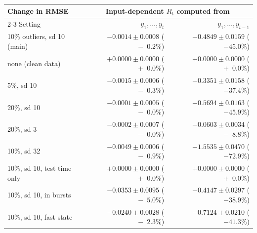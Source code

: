 \small
\begin{tabular}{@{}lrr@{}}
\toprule
Change in RMSE & \multicolumn{2}{c}{Input-dependent $R_t$ computed from} \\
\cmidrule(l){2-3}
Setting & $y_1, \dots, y_t$ & $y_1, \dots, y_{t-1}$ \\
\midrule
10\% outliers, sd 10 (main) & $-0.0014 \pm 0.0008$ ($-\phantom{0}0.2\%$) & $-0.4849 \pm 0.0159$ ($-45.0\%$) \\
none (clean data) & $+0.0000 \pm 0.0000$ ($+\phantom{0}0.0\%$) & $+0.0000 \pm 0.0000$ ($+\phantom{0}0.0\%$) \\
5\%, sd 10 & $-0.0015 \pm 0.0006$ ($-\phantom{0}0.3\%$) & $-0.3351 \pm 0.0158$ ($-37.4\%$) \\
20\%, sd 10 & $-0.0001 \pm 0.0005$ ($-\phantom{0}0.0\%$) & $-0.5694 \pm 0.0163$ ($-45.9\%$) \\
20\%, sd 3 & $-0.0002 \pm 0.0007$ ($-\phantom{0}0.0\%$) & $-0.0603 \pm 0.0034$ ($-\phantom{0}8.8\%$) \\
10\%, sd 32 & $-0.0049 \pm 0.0006$ ($-\phantom{0}0.9\%$) & $-1.5535 \pm 0.0470$ ($-72.9\%$) \\
10\%, sd 10, test time only & $+0.0000 \pm 0.0000$ ($+\phantom{0}0.0\%$) & $+0.0000 \pm 0.0000$ ($+\phantom{0}0.0\%$) \\
10\%, sd 10, in bursts & $-0.0353 \pm 0.0095$ ($-\phantom{0}5.0\%$) & $-0.4147 \pm 0.0297$ ($-38.9\%$) \\
10\%, sd 10, fast state & $-0.0240 \pm 0.0028$ ($-\phantom{0}2.3\%$) & $-0.7124 \pm 0.0210$ ($-41.3\%$) \\
\bottomrule
\end{tabular}
